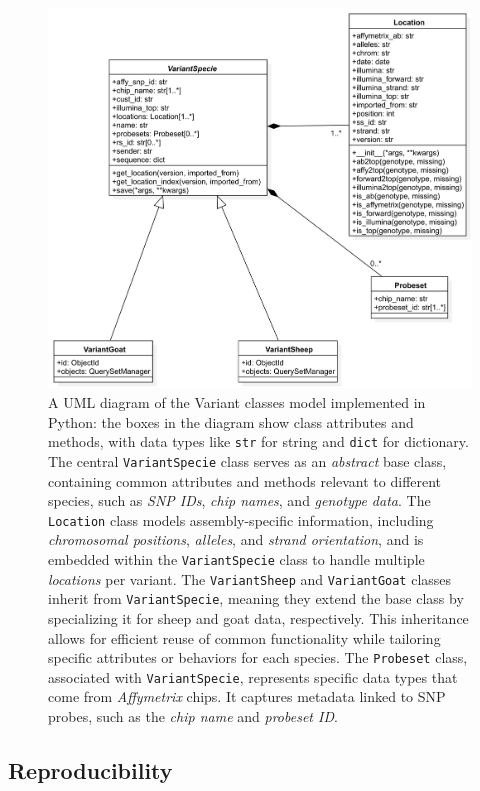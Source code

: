 \documentclass[a4paper,num-refs,gigabyte]{oup-contemporary}
\begin{document}
\begin{figure}%
\centering
\includegraphics[width=.7\textwidth]{VariantModel.png}
\caption{A UML diagram of the Variant classes model implemented in Python: the boxes in the diagram show class attributes and methods, with data types like \texttt{str} for string and \texttt{dict} for dictionary. The central \texttt{VariantSpecie} class serves as an \textit{abstract} base class, containing common attributes and methods relevant to different species, such as \textit{SNP IDs}, \textit{chip names}, and \textit{genotype data}. The \texttt{Location} class models assembly-specific information, including \textit{chromosomal positions}, \textit{alleles}, and \textit{strand orientation}, and is embedded within the \texttt{VariantSpecie} class to handle multiple \textit{locations} per variant.
The \texttt{VariantSheep} and \texttt{VariantGoat} classes inherit from \texttt{VariantSpecie}, meaning they extend the base class by specializing it for sheep and goat data, respectively. This inheritance allows for efficient reuse of common functionality while tailoring specific attributes or behaviors for each species. The \texttt{Probeset} class, associated with \texttt{VariantSpecie}, represents specific data types that come from \textit{Affymetrix} chips. It captures metadata linked to SNP probes, such as the \textit{chip name} and \textit{probeset ID}.}
\label{fig:variant_class_model}
\end{figure}

\subsection{Reproducibility}
\end{document}
